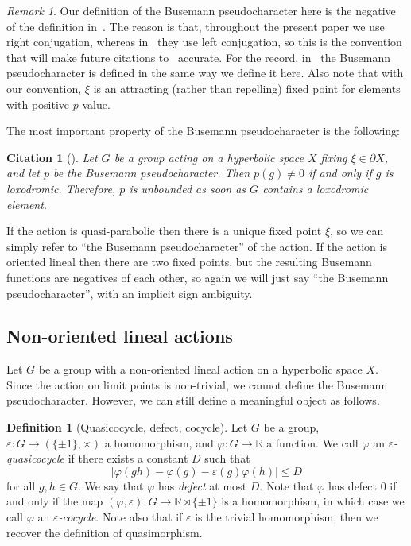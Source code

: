\documentclass[10pt,a4paper]{article}
\theoremstyle{definition}
\newtheorem{defi}[cdrthm]{Definition}
\theoremstyle{remark}
\newtheorem{rema}[cdrthm]{Remark}
\newcommand{\R}{\mathbb{R}}
\theoremstyle{plain}
\newtheorem{cit}[cdrthm]{Citation}
\begin{document}
\begin{rema}\label{rem:left_right}
Our definition of the Busemann pseudocharacter here is the negative of the definition in~\cite{confining}. The reason is that, throughout the present paper we use right conjugation, whereas in~\cite{confining} they use left conjugation, so this is the convention that will make future citations to~\cite{confining} accurate. For the record, in~\cite{caprace15} the Busemann pseudocharacter is defined in the same way we define it here. Also note that with our convention, $\xi$ is an attracting (rather than repelling) fixed point for elements with positive $p$ value.
\end{rema}

The most important property of the Busemann pseudocharacter is the following:

\begin{cit}[{\cite[Section 4.1]{manning}}]
\label{cit:busemann:loxodromic}
    Let $G$ be a group acting on a hyperbolic space $X$ fixing $\xi \in \partial X$, and let $p$ be the Busemann pseudocharacter. Then $p(g) \neq 0$ if and only if $g$ is loxodromic. Therefore, $p$ is unbounded as soon as $G$ contains a loxodromic element.
\end{cit}

If the action is quasi-parabolic then there is a unique fixed point $\xi$, so we can simply refer to ``the Busemann pseudocharacter'' of the action. If the action is oriented lineal then there are two fixed points, but the resulting Busemann functions are negatives of each other, so again we will just say ``the Busemann pseudocharacter'', with an implicit sign ambiguity.


\subsection{Non-oriented lineal actions}

Let $G$ be a group with a non-oriented lineal action on a hyperbolic space $X$. Since the action on limit points is non-trivial, we cannot define the Busemann pseudocharacter. However, we can still define a meaningful object as follows.

\begin{defi}[Quasicocycle, defect, cocycle]
    Let $G$ be a group, $\varepsilon \colon G \to (\{ \pm 1 \}, \times)$ a homomorphism, and $\varphi \colon G \to \R$ a function. We call $\varphi$ an \emph{$\varepsilon$-quasicocycle} if there exists a constant $D$ such that
    \[ |\varphi(gh) - \varphi(g) - \varepsilon(g)\varphi(h)| \leq D\]
    for all $g, h \in G$. We say that $\varphi$ has \emph{defect} at most $D$. Note that $\varphi$ has defect $0$ if and only if the map $(\varphi, \varepsilon) \colon G \to \R \rtimes \{ \pm 1 \}$ is a homomorphism, in which case we call $\varphi$ an \emph{$\varepsilon$-cocycle}. Note also that if $\varepsilon$ is the trivial homomorphism, then we recover the definition of quasimorphism.
\end{defi}
\end{document}

